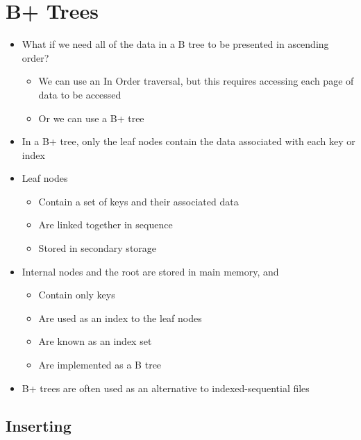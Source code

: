 \section*{B+ Trees}

\begin{itemize}
  \item What if we need all of the data in a B tree to be presented in ascending order?
  \begin{itemize}
    \item We can use an In Order traversal, but this requires accessing each page of data to be accessed
    \item Or we can use a B+ tree
  \end{itemize}
  \item In a B+ tree, only the leaf nodes contain the data associated with each key or index
  \item Leaf nodes
  \begin{itemize}
    \item Contain a set of keys and their associated data
    \item Are linked together in sequence
    \item Stored in secondary storage
  \end{itemize}
  \item Internal nodes and the root are stored in main memory, and
  \begin{itemize}
    \item Contain only keys
    \item Are used as an index to the leaf nodes
    \item Are known as an index set
    \item Are implemented as a B tree
  \end{itemize}
  \item B+ trees are often used as an alternative to indexed-sequential files
\end{itemize}

\subsection*{Inserting}

